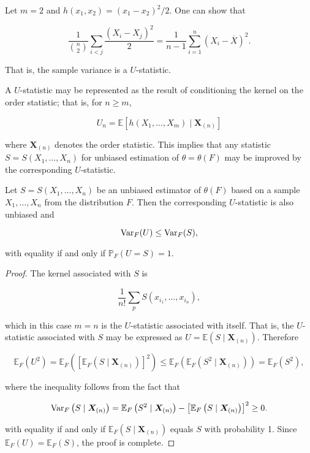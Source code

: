 \begin{example}\label{mathstats.ex.15.2.dasgupta}

Let \(m=2\) and \(h(x_1, x_2) = (x_1 -x_2)^2/2\). One can show that

\[
\frac{1}{\binom{n}{2}} \sum_{i < j} \frac{(X_i -X_j)^2}{2} = \frac{1}{n-1} \sum_{i=1}^n (X_i - \overline{X})^2.
\]

That is, the sample variance is a \(U\)-statistic.

\end{example}

A \(U\)-statistic may be represented as the result of conditioning the kernel on the order statistic; that is, for \(n \geq m\),

\[
U_n = \mathbb{E}\left[ h(X_1, \ldots, X_m) \mid \boldsymbol{X}_{(n)} \right]
\]

where \( \boldsymbol{X}_{(n)}\) denotes the order statistic. This implies that any statistic \(S = S(X_1, \ldots, X_n)\) for unbiased estimation of \(\theta = \theta(F)\) may be improved by the corresponding \(U\)-statistic. 

\begin{theorem}

Let \(S = S(X_1, \ldots, X_n)\) be an unbiased estimator of \(\theta(F)\) based on a sample \(X_1, \ldots, X_n\) from the distribution \(F\). Then the corresponding \(U\)-statistic is also unbiased and

\[
\Var_F(U) \leq \Var_F(S),
\]

with equality if and only if \(\mathbb{P}_F(U = S) = 1\).

\end{theorem}

\begin{proof}

The kernel associated with \(S\) is 

\[
\frac{1}{n!} \sum_p S(x_{i_1}, \ldots, x_{i_n}),
\]

which in this case \(m=n\) is the \(U\)-statistic associated with itself. That is, the \(U\)-statistic associated with \(S\) may be expressed as \(U = \mathbb{E}(S \mid \boldsymbol{X}_{(n)})\). Therefore

\[
 \mathbb{E}_F(U^2) = \mathbb{E}_F\left(\left[\mathbb{E}_F \left(S \mid\boldsymbol{X}_{(n)}\right) \right]^2 \right) \leq  \mathbb{E}_F\left(\mathbb{E}_F \left(S^2 \mid\boldsymbol{X}_{(n)}\right)  \right) = \mathbb{E}_F(S^2),
\]

where the inequality follows from the fact that

\[
\Var_F\left(S \mid \boldsymbol{X}_{(n)} \right) = \mathbb{E}_F \left(S^2 \mid\boldsymbol{X}_{(n)}\right)  - \left[\mathbb{E}_F \left(S \mid\boldsymbol{X}_{(n)}\right) \right]^2  \geq 0.
\]

with equality if and only if \(\mathbb{E}_F(S \mid \boldsymbol{X}_{(n)})\) equals \(S\) with probability 1. Since \(\mathbb{E}_F(U) = \mathbb{E}_F(S)\), the proof is complete.

\end{proof}

